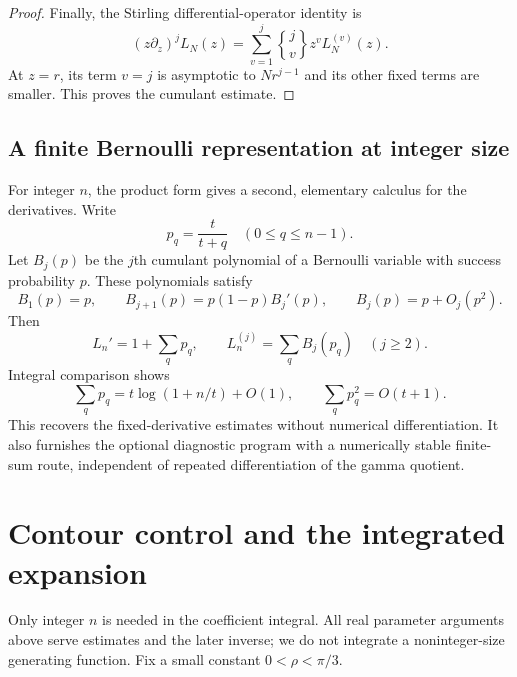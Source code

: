 \documentclass[11pt,letterpaper]{article}
\numberwithin{equation}{section}
\theoremstyle{definition}\newtheorem{definition}[theorem]{Definition}
\theoremstyle{remark}\newtheorem{remark}[theorem]{Remark}
\newcommand{\stwo}[2]{\genfrac{\{} {\}}{0pt}{}{#1}{#2}}
\begin{document}
\begin{proof}
Finally, the Stirling differential-operator identity is
\begin{equation}\label{sfp:pc:eq:operator}
 (z\partial_z)^jL_N(z)
   =\sum_{v=1}^j\stwo jv z^v L_N^{(v)}(z).
\end{equation}
At $z=r$, its term $v=j$ is asymptotic to $Nr^{j-1}$ and its
other fixed terms are smaller. This proves the cumulant estimate.
\end{proof}

\subsection{A finite Bernoulli representation at integer size}

For integer $n$, the product form gives a second, elementary
calculus for the derivatives. Write
\begin{equation}\label{sfp:pc:eq:p}
 p_q=\frac{t}{t+q}\quad(0\leq q\leq n-1).
\end{equation}
Let $B_j(p)$ be the $j$th cumulant polynomial of a Bernoulli
variable with success probability $p$. These polynomials satisfy
\begin{equation}\label{sfp:pc:eq:bernoulli}
 B_1(p)=p,\qquad
 B_{j+1}(p)=p(1-p)B_j'(p),\qquad B_j(p)=p+O_j(p^2).
\end{equation}
Then
\begin{equation}\label{sfp:pc:eq:integerderivatives}
 L_n'=1+\sum_qp_q,\qquad
 L_n^{(j)}=\sum_qB_j(p_q)\quad(j\geq2).
\end{equation}
Integral comparison shows
\[
 \sum_qp_q=t\log(1+n/t)+O(1),\qquad
 \sum_qp_q^2=O(t+1).
\]
This recovers the fixed-derivative estimates without numerical
differentiation. It also furnishes the optional diagnostic program
with a numerically stable finite-sum route, independent of repeated
differentiation of the gamma quotient.

\section{Contour control and the integrated expansion}\label{sfp:pc:sec:contour}

Only integer $n$ is needed in the coefficient integral. All real
parameter arguments above serve estimates and the later inverse;
we do not integrate a noninteger-size generating function.
Fix a small constant $0<\rho<\pi/3$.
\end{document}
